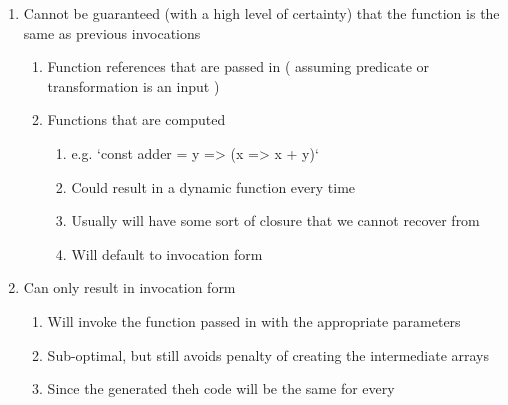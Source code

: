 \begin{enumerate}
    \begin{enumerate}
      \item  Cannot be guaranteed (with a high level of certainty) that the function is the same as previous invocations
        \begin{enumerate}
          \item Function references that are passed in ( assuming predicate or transformation is an input )
          \item Functions that are computed
            \begin{enumerate}
              \item e.g. `const adder = y => (x => x + y)` 
              \item Could result in a dynamic function every time
              \item Usually will have some sort of closure that we cannot recover from
              \item Will default to invocation form 
            \end{enumerate}
        \end{enumerate}
      \item Can only result in invocation form
        \begin{enumerate}
          \item Will invoke the function passed in with the appropriate parameters
          \item Sub-optimal, but still avoids penalty of creating the intermediate arrays
          \item Since the generated theh code will be the same for every
        \end{enumerate}
    \end{enumerate}
\end{enumerate}

